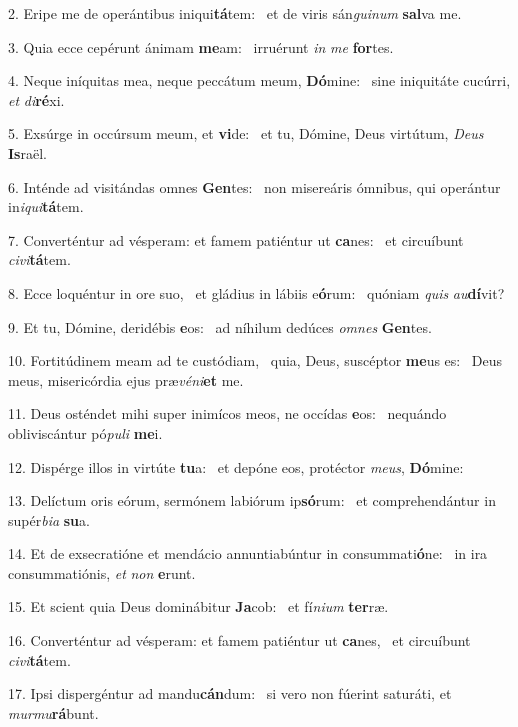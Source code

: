 2. Eripe me de operántibus iniqui\textbf{tá}tem: \ast\  et de viris sán\textit{gui}\textit{num} \textbf{sal}va me.\

3. Quia ecce cepérunt ánimam \textbf{me}am: \ast\  irruérunt \textit{in} \textit{me} \textbf{for}tes.\

4. Neque iníquitas mea, neque peccátum meum, \textbf{Dó}mine: \ast\  sine iniquitáte cucúrri, \textit{et} \textit{di}\textbf{ré}xi.\

5. Exsúrge in occúrsum meum, et \textbf{vi}de: \ast\  et tu, Dómine, Deus virtútum, \textit{De}\textit{us} \textbf{Is}raël.\

6. Inténde ad visitándas omnes \textbf{Gen}tes: \ast\  non misereáris ómnibus, qui operántur in\textit{i}\textit{qui}\textbf{tá}tem.\

7. Converténtur ad vésperam: et famem patiéntur ut \textbf{ca}nes: \ast\  et circuíbunt \textit{ci}\textit{vi}\textbf{tá}tem.\

8. Ecce loquéntur in ore suo, \dag\  et gládius in lábiis e\textbf{ó}rum: \ast\  quóniam \textit{quis} \textit{au}\textbf{dí}vit?\

9. Et tu, Dómine, deridébis \textbf{e}os: \ast\  ad níhilum dedúces \textit{om}\textit{nes} \textbf{Gen}tes.\

10. Fortitúdinem meam ad te custódiam, \dag\  quia, Deus, suscéptor \textbf{me}us es: \ast\  Deus meus, misericórdia ejus præ\textit{vé}\textit{ni}\textbf{et} me.\

11. Deus osténdet mihi super inimícos meos, ne occídas \textbf{e}os: \ast\  nequándo obliviscántur pó\textit{pu}\textit{li} \textbf{me}i.\

12. Dispérge illos in virtúte \textbf{tu}a: \ast\  et depóne eos, protéctor \textit{me}\textit{us}, \textbf{Dó}mine:\

13. Delíctum oris eórum, sermónem labiórum ip\textbf{só}rum: \ast\  et comprehendántur in supér\textit{bi}\textit{a} \textbf{su}a.\

14. Et de exsecratióne et mendácio annuntiabúntur in consummati\textbf{ó}ne: \ast\  in ira consummatiónis, \textit{et} \textit{non} \textbf{e}runt.\

15. Et scient quia Deus dominábitur \textbf{Ja}cob: \ast\  et fí\textit{ni}\textit{um} \textbf{ter}ræ.\

16. Converténtur ad vésperam: et famem patiéntur ut \textbf{ca}nes, \ast\  et circuíbunt \textit{ci}\textit{vi}\textbf{tá}tem.\

17. Ipsi dispergéntur ad mandu\textbf{cán}dum: \ast\  si vero non fúerint saturáti, et \textit{mur}\textit{mu}\textbf{rá}bunt.\

